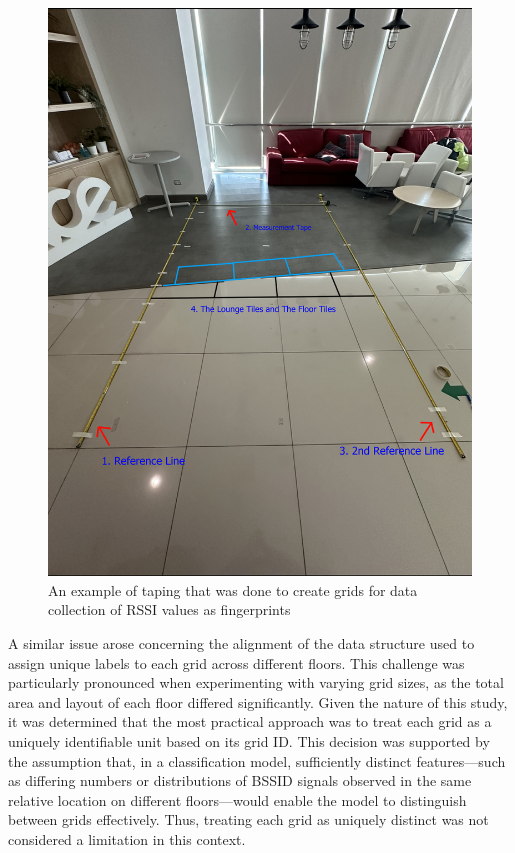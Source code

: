 \documentclass[conference]{IEEEtran}
\begin{document}
	\begin{figure}[htbp]
		\centerline{\includegraphics[scale=0.21]{meth2.jpg}}
		\caption{An example of taping that was done to create grids for data collection of RSSI values as fingerprints}
		\label{fig:taping}
	\end{figure}
	
	A similar issue arose concerning the alignment of the data structure used to assign unique labels to each grid across different floors. This challenge was particularly pronounced when experimenting with varying grid sizes, as the total area and layout of each floor differed significantly. Given the nature of this study, it was determined that the most practical approach was to treat each grid as a uniquely identifiable unit based on its grid ID. This decision was supported by the assumption that, in a classification model, sufficiently distinct features—such as differing numbers or distributions of BSSID signals observed in the same relative location on different floors—would enable the model to distinguish between grids effectively. Thus, treating each grid as uniquely distinct was not considered a limitation in this context.
	
\end{document}
